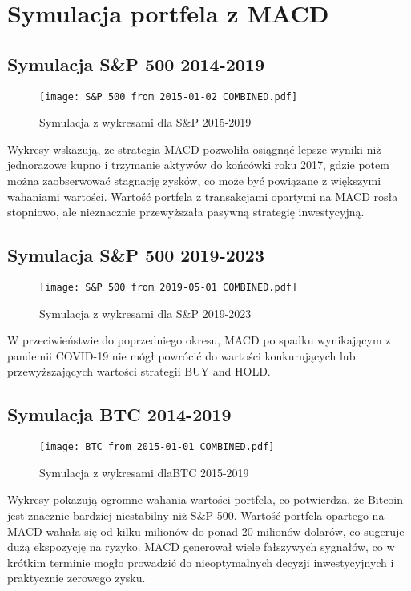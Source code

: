 \documentclass[12pt, letterpaper]{article}
\begin{document}
\vspace{10cm} 
\section{Symulacja portfela z MACD}

\subsection{Symulacja S\&P 500 2014-2019}
\begin{figure}[h!]
    \centering
    \texttt{[image: S\&P 500 from 2015-01-02 COMBINED.pdf]}
    \caption{Symulacja z wykresami dla S\&P 2015-2019}
    \label{fig:BTC_2014_2017}
\end{figure}
Wykresy wskazują, że strategia MACD pozwoliła osiągnąć lepsze wyniki niż jednorazowe kupno i trzymanie aktywów do końcówki roku 2017,
 gdzie potem można zaobserwować stagnację zysków, co może być powiązane z większymi wahaniami wartości. 
 Wartość portfela z transakcjami opartymi na MACD rosła stopniowo, ale nieznacznie przewyższała pasywną strategię inwestycyjną.

\vspace{10cm} 
\subsection{Symulacja S\&P 500 2019-2023}
\begin{figure}[h!]
    \centering
    \texttt{[image: S\&P 500 from 2019-05-01 COMBINED.pdf]}
    \caption{Symulacja z wykresami dla S\&P 2019-2023}
    \label{fig:BTC_2014_2017}
\end{figure}

W przeciwieństwie do poprzedniego okresu, MACD po spadku wynikającym z pandemii COVID-19 nie mógł powrócić do wartości konkurujących lub przewyższających wartości strategii BUY and HOLD.
\vspace{10cm} 
\subsection{Symulacja BTC 2014-2019}
\begin{figure}[h!]
    \centering
    \texttt{[image: BTC from 2015-01-01 COMBINED.pdf]}
    \caption{Symulacja z wykresami dlaBTC 2015-2019}
    \label{fig:BTC_2014_2017}
\end{figure}
Wykresy pokazują ogromne wahania wartości portfela, co potwierdza, że Bitcoin jest znacznie bardziej niestabilny niż S\&P 500.
Wartość portfela opartego na MACD wahała się od kilku milionów do ponad 20 milionów dolarów, co sugeruje dużą ekspozycję na ryzyko.
MACD generował wiele fałszywych sygnałów, co w krótkim terminie mogło prowadzić do nieoptymalnych decyzji inwestycyjnych i praktycznie zerowego zysku.
\end{document}
